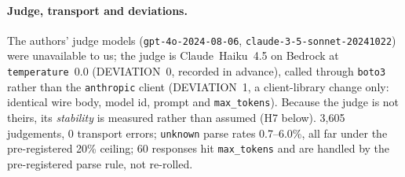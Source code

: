 \paragraph{Judge, transport and deviations.} The authors' judge models (\texttt{gpt-4o-2024-08-06}, \texttt{claude-3-5-sonnet-20241022}) were unavailable to us; the judge is Claude~Haiku~4.5 on Bedrock at \texttt{temperature}~0.0 (DEVIATION~0, recorded in advance), called through \texttt{boto3} rather than the \texttt{anthropic} client (DEVIATION~1, a client-library change only: identical wire body, model id, prompt and \texttt{max\_tokens}). Because the judge is not theirs, its \emph{stability} is measured rather than assumed (H7 below). 3{,}605 judgements, 0 transport errors; \texttt{unknown} parse rates 0.7--6.0\%, all far under the pre-registered 20\% ceiling; 60 responses hit \texttt{max\_tokens} and are handled by the pre-registered parse rule, not re-rolled.

